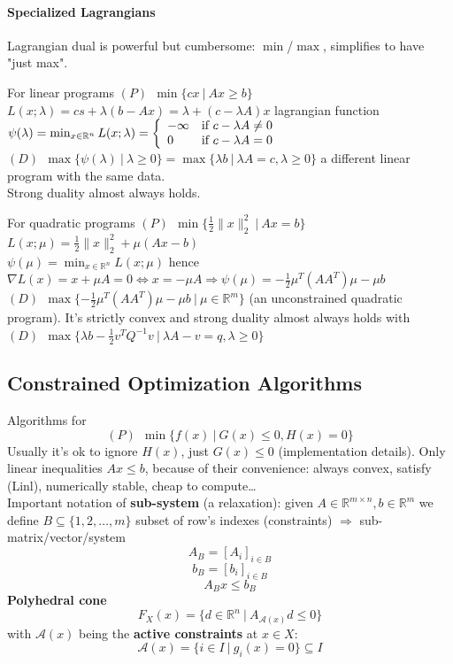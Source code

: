 \documentclass[10pt]{report}
\begin{document}
\paragraph{Specialized Lagrangians} Lagrangian dual is powerful but cumbersome: $\min$/$\max$, simplifies to have "just max".\begin{list}{}{}
	\item For linear programs $(P)\:\:\min\{cx\:|\:Ax\geq b\}$\\
	$L(x;\lambda) = cs + \lambda(b-Ax)=\lambda +(c-\lambda A)x$ lagrangian function\\
	$\psi(\lambda)=\min_{x\in \mathbb{R}^n} L(x;\lambda)=\left\{\begin{array}{l l}
	-\infty& \text{if }c-\lambda A\neq 0\\
	0& \text{if }c-\lambda A= 0\\
	\end{array}\right.$\\
	$(D)\:\:\max\{\psi(\lambda)\:|\:\lambda\geq 0\}=\max\{\lambda b\:|\:\lambda A=c, \lambda\geq 0\}$ a different linear program with the same data.\\
	Strong duality almost always holds.
	\item For quadratic programs $(P)\:\:\min\{\frac{1}{2}\|x\|_2^2\:|\:Ax = b\}$\\
	 $L(x;\mu)=\frac{1}{2}\|x\|_2^2+\mu(Ax-b)$\\
	 $\psi(\mu)=\min_{x\in \mathbb{R}^n} L(x;\mu)$ hence $\nabla L(x)=x+\mu A = 0 \Leftrightarrow x = - \mu A\Rightarrow \psi(\mu)=-\frac{1}{2}\mu^T(AA^T)\mu - \mu b$\\
	 $(D)\:\:\max\{-\frac{1}{2}\mu^T(AA^T)\mu-\mu b\:|\:\mu \in \mathbb{R}^m\}$ (an unconstrained quadratic program). It's strictly convex and strong duality almost always holds with $(D)\:\:\max\{\lambda b-\frac{1}{2}v^TQ^{-1}v\:|\:\lambda A-v=q, \lambda\geq 0\}$
\end{list}
\subsection{Constrained Optimization Algorithms} Algorithms for $$(P)\:\:\min\{f(x)\:|\:G(x)\leq 0, H(x) = 0\}$$
Usually it's ok to ignore $H(x)$, just $G(x)\leq 0$ (implementation details). Only linear inequalities $Ax\leq b$, because of their convenience: always convex, satisfy (Linl), numerically stable, cheap to compute\ldots\\
Important notation of \textbf{sub-system} (a relaxation): given $A\in \mathbb{R}^{m\times n}, b\in \mathbb{R}^m$ we define $B\subseteq\{1,2,\ldots,m\}$ subset of row's indexes (constraints) $\Rightarrow$ sub-matrix/vector/system $$A_B=[A_i]_{i\in B}$$ $$b_B=[b_i]_{i\in B}$$ $$A_Bx \leq b_B$$
\textbf{Polyhedral cone} $$F_X(x)=\{d\in \mathbb{R}^n\:|\:A_{\mathscr{A}(x)} d\leq 0\}$$ with $\mathscr{A}(x)$ being the 
\textbf{active constraints} at $x\in X$: $$\mathscr{A}(x) = \{i\in I\:|\:g_i(x)=0\}\subseteq I$$
\end{document}
